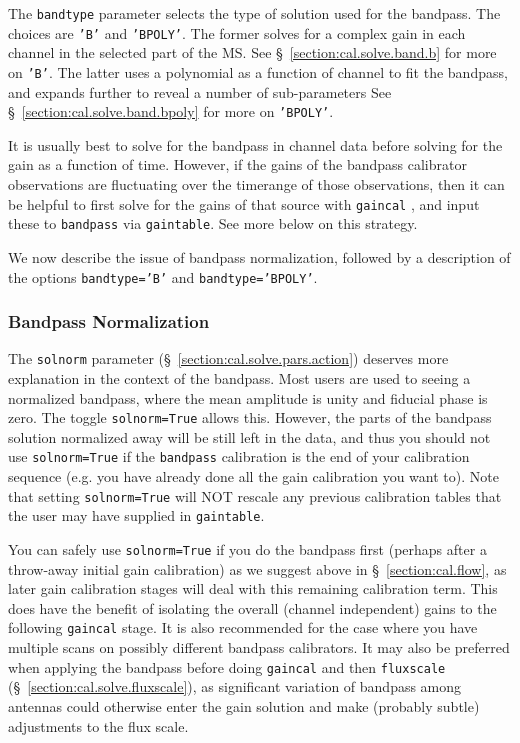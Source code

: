 The {\tt bandtype} parameter selects the type of solution used for the
bandpass.  The choices are {\tt 'B'} and {\tt 'BPOLY'}.  The former 
solves for a complex gain in each channel in the selected part of the
MS. See \S~\ref{section:cal.solve.band.b} for more on {\tt 'B'}.
The latter uses a polynomial as a function of channel to fit the
bandpass, and expands further to reveal a number of sub-parameters
See \S~\ref{section:cal.solve.band.bpoly} for more on {\tt 'BPOLY'}.

It is usually best to solve for the bandpass in channel data before
solving for the gain as a function of time.  However, if the gains of
the bandpass calibrator observations are fluctuating over the
timerange of those observations, then it can be helpful to first solve
for the gains of that source with {\tt gaincal} , and input these to
{\tt bandpass} via {\tt gaintable}.  See more below on this strategy.

We now describe the issue of bandpass normalization, followed by
a description of the options {\tt bandtype='B'} and {\tt bandtype='BPOLY'}.

\subsubsection{Bandpass Normalization}
\label{section:cal.solve.band.solnorm}

The {\tt solnorm} parameter (\S~\ref{section:cal.solve.pars.action})
deserves more explanation in the context of the bandpass.  Most users
are used to seeing a normalized bandpass, where the mean amplitude
is unity and fiducial phase is zero. 
The toggle {\tt solnorm=True} allows this.  However, the parts of the
bandpass solution normalized away will be still left in the data,
and thus you should not use {\tt solnorm=True} if the {\tt bandpass}
calibration is the end of your calibration sequence (e.g. you have
already done all the gain calibration you want to).  Note that
setting {\tt solnorm=True} will NOT rescale any previous calibration
tables that the user may have supplied in {\tt gaintable}.

You can safely use {\tt solnorm=True} if you do the bandpass first
(perhaps after a throw-away initial gain calibration) as we suggest above in
\S~\ref{section:cal.flow}, as later gain calibration stages will deal with this
remaining calibration term.  This does have the benefit of isolating
the overall (channel independent) gains to the following {\tt gaincal}
stage.  It is also recommended for the case where you have multiple
scans on possibly different bandpass calibrators.  It may also be 
preferred when applying the bandpass before doing {\tt gaincal} and 
then {\tt fluxscale} (\S~\ref{section:cal.solve.fluxscale}), 
as significant variation of bandpass among antennas could otherwise 
enter the gain solution and make (probably subtle) adjustments to the
flux scale.

